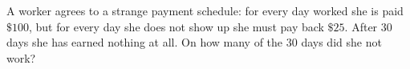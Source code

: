 A worker agrees to a strange payment schedule: for every day worked she is paid $\$100$, but for every day she does not show up she must pay back $\$25$. After $30$ days she has earned nothing at all. On how many of the $30$ days did she not work?
